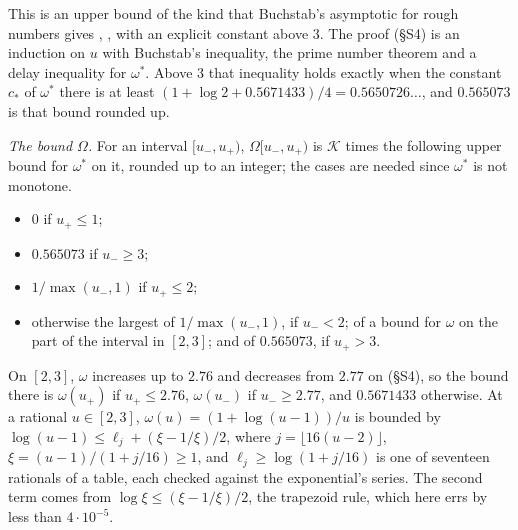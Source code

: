 \documentclass[11pt]{article}
\theoremstyle{definition}
\begin{document}
This is an upper bound of the kind that Buchstab's asymptotic for rough numbers gives \cite{buchstab},
\cite[Chapter~III.6]{tenenbaum}, with an explicit constant above $3$. The proof (\S S4) is an induction on $u$ with
Buchstab's inequality, the prime number theorem and a delay inequality for $\omega^*$. Above $3$ that inequality holds
exactly when the constant $c_*$ of $\omega^*$ there is at least $(1 + \log 2 + 0.5671433)/4 = 0.5650726\ldots$, and
$0.565073$ is that bound rounded up.

\emph{The bound $\Omega$.} For an interval $[u_-, u_+)$, $\Omega[u_-, u_+)$ is $\mathcal K$ times the following upper
bound for $\omega^*$ on it, rounded up to an integer; the cases are needed since $\omega^*$ is not monotone.
\begin{itemize}
\item $0$ if $u_+ \le 1$;
\item $0.565073$ if $u_- \ge 3$;
\item $1/\max(u_-, 1)$ if $u_+ \le 2$;
\item otherwise the largest of $1/\max(u_-, 1)$, if $u_- < 2$; of a bound for $\omega$ on the part of the interval in
  $[2, 3]$; and of $0.565073$, if $u_+ > 3$.
\end{itemize}
On $[2, 3]$, $\omega$ increases up to $2.76$ and decreases from $2.77$ on (\S S4), so the bound there is $\omega(u_+)$
if
$u_+ \le 2.76$, $\omega(u_-)$ if $u_- \ge 2.77$, and $0.5671433$ otherwise. At a rational $u \in [2, 3]$, $\omega(u) =
(1
+ \log(u - 1))/u$ is bounded by $\log(u - 1) \le \ell_j + (\xi - 1/\xi)/2$, where $j = \lfloor 16(u - 2) \rfloor$, $\xi
=
(u - 1)/(1 + j/16) \ge 1$, and $\ell_j \ge \log(1 + j/16)$ is one of seventeen rationals of a table, each checked
against
the exponential's series. The second term comes from $\log \xi \le (\xi - 1/\xi)/2$, the trapezoid rule, which here errs
by less than $4 \cdot 10^{-5}$.
\end{document}
